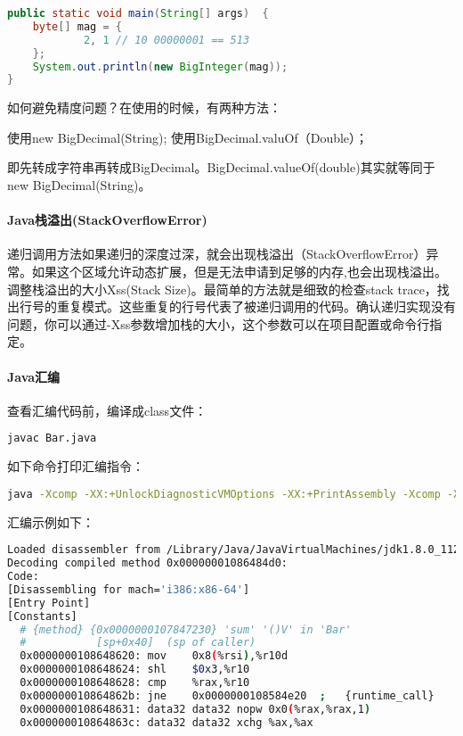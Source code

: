 \documentclass[../../../interview-questions.tex]{subfiles}
\begin{document}
\begin{lstlisting}[language=Java]
public static void main(String[] args)  {
    byte[] mag = {
            2, 1 // 10 00000001 == 513
    };
    System.out.println(new BigInteger(mag));
}
\end{lstlisting}

如何避免精度问题？在使用的时候，有两种方法：

使用new BigDecimal(String);
使用BigDecimal.valuOf（Double）；

即先转成字符串再转成BigDecimal。BigDecimal.valueOf(double)其实就等同于new BigDecimal(String)。

\paragraph{Java栈溢出(StackOverflowError)}

递归调用方法如果递归的深度过深，就会出现栈溢出（StackOverflowError）异常。如果这个区域允许动态扩展，但是无法申请到足够的内存,也会出现栈溢出。调整栈溢出的大小Xss(Stack Size)。最简单的方法就是细致的检查stack trace，找出行号的重复模式。这些重复的行号代表了被递归调用的代码。确认递归实现没有问题，你可以通过-Xss参数增加栈的大小，这个参数可以在项目配置或命令行指定。

\paragraph{Java汇编}

查看汇编代码前，编译成class文件：

\begin{lstlisting}[language=Bash]
javac Bar.java
\end{lstlisting}


如下命令打印汇编指令：

\begin{lstlisting}[language=Bash]
java -Xcomp -XX:+UnlockDiagnosticVMOptions -XX:+PrintAssembly -Xcomp -XX:CompileCommand=dontinline,*Bar.sum -XX:CompileCommand=compileonly,*Bar.sum Bar
\end{lstlisting}

汇编示例如下：
 
\begin{lstlisting}[language=Bash]
Loaded disassembler from /Library/Java/JavaVirtualMachines/jdk1.8.0_112.jdk/Contents/Home/jre/lib/hsdis-amd64.dylib
Decoding compiled method 0x00000001086484d0:
Code:
[Disassembling for mach='i386:x86-64']
[Entry Point]
[Constants]
  # {method} {0x0000000107847230} 'sum' '()V' in 'Bar'
  #           [sp+0x40]  (sp of caller)
  0x0000000108648620: mov    0x8(%rsi),%r10d
  0x0000000108648624: shl    $0x3,%r10
  0x0000000108648628: cmp    %rax,%r10
  0x000000010864862b: jne    0x0000000108584e20  ;   {runtime_call}
  0x0000000108648631: data32 data32 nopw 0x0(%rax,%rax,1)
  0x000000010864863c: data32 data32 xchg %ax,%ax
\end{lstlisting}
\end{document}
